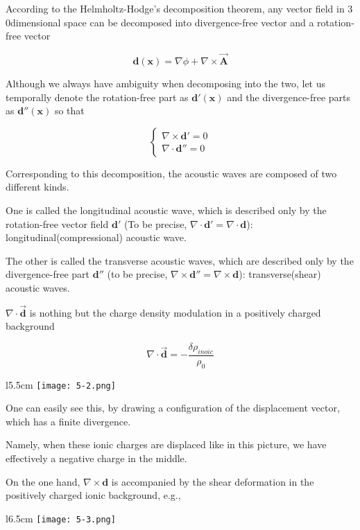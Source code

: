 According to the Helmholtz-Hodge's decomposition theorem, any vector field in $3$0dimensional space can be decomposed into divergence-free vector and a rotation-free vector

\[\bm{d(x)} = \nabla\phi + \nabla\times\vec{\bm{A}} \]

Although we always have ambiguity when decomposing into the two, let us temporally denote the rotation-free part as $\bm{d'(x)}$ and the divergence-free parts as $\bm{d''(x)}$ so that

\[\begin{cases}
\nabla\times\bm{d'} = 0\\
\nabla\cdot\bm{d''} = 0
\end{cases}\]

Corresponding to this decomposition, the acoustic waves are composed of two different kinds.

One is called the longitudinal acoustic wave, which is described only by the rotation-free vector field $\bm{d'}$ (To be precise, $\nabla\cdot \bm{d'} = \nabla\cdot\bm{d}$): longitudinal(compressional) acoustic wave.

The other is called the transverse acoustic waves, which are described only by the divergence-free part $\bm{d''}$ (to be precise, $\nabla\times\bm{d''} = \nabla\times\bm{d}$): transverse(shear) acoustic waves.

$\nabla\cdot \vec{\bm{d}}$ is nothing but the charge density modulation in a positively charged background

\[\nabla\cdot\vec{\bm{d}} = -\frac{\delta\rho_{inoic}}{\rho_0}\]

\begin{wrapfigure}{l}{5.5cm}
\texttt{[image: 5-2.png]}
\end{wrapfigure}
One can easily see this, by drawing a configuration of the displacement vector, which has a finite divergence.

Namely, when these ionic charges are displaced like in this picture, we have effectively a negative charge in the middle.

On the one hand, $\nabla\times\bm{d}$ is accompanied by the shear deformation in the positively charged ionic background, e.g.,

\begin{figure}
\end{figure}
\begin{wrapfigure}{l}{6.5cm}
\texttt{[image: 5-3.png]}
\end{wrapfigure}


